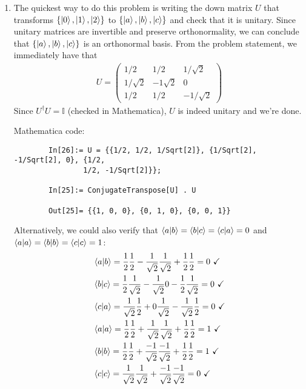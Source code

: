 \documentclass{article}
\theoremstyle{definition}
\newcommand{\f}[2]{\frac{#1}{#2}}
\begin{document}
\begin{enumerate}[label=(\alph*)]
	\item The quickest way to do this problem is writing the down matrix $U$ that transforms $\{\ket{0},\ket{1},\ket{2}\}$ to $\{\ket{a},\ket{b}, \ket{c}\}$ and check that it is unitary. Since unitary matrices are invertible and preserve orthonormality, we can conclude that $\{\ket{a},\ket{b}, \ket{c}\}$ is an orthonormal basis. From the problem statement, we immediately have that 
	\begin{align*}
		U = \begin{pmatrix}
			1/2 & 1/2 & 1/\sqrt{2} \\
			1/\sqrt{2} & -1\sqrt{2} & 0 \\
			1/2 & 1/2 & -1/\sqrt{2}
		\end{pmatrix}
	\end{align*}
	Since $U^\dagger U = \mathbb{I}$ (checked in Mathematica), $U$ is indeed unitary and we're done. 
	
	
	
	Mathematica code:
	\begin{lstlisting}
		In[26]:= U = {{1/2, 1/2, 1/Sqrt[2]}, {1/Sqrt[2], -1/Sqrt[2], 0}, {1/2,
				1/2, -1/Sqrt[2]}};
		
		In[25]:= ConjugateTranspose[U] . U
		
		Out[25]= {{1, 0, 0}, {0, 1, 0}, {0, 0, 1}}
	\end{lstlisting}
	
	Alternatively, we could also verify that $\bra{a}\ket{b}= \bra{b}\ket{c}= \bra{c}\ket{a}=0$ and $\braket{a} = \braket{b} = \braket{c} = 1$:
	\begin{align*}
		&\bra{a}\ket{b} = \f{1}{2}\f{1}{2} - \f{1}{\sqrt{2}} \f{1}{\sqrt{2}} + \f{1}{2}\f{1}{2} = 0 \,\,\checkmark\\
		&\bra{b}\ket{c} = \f{1}{2}\f{1}{\sqrt{2}} - \f{1}{\sqrt{2}} 0 - \f{1}{2}\f{1}{\sqrt{2}} = 0 \,\,\checkmark \\
		&\bra{c}\ket{a} = \f{1}{\sqrt{2}}\f{1}{2} + 0 \f{1}{\sqrt{2}} - \f{1}{\sqrt{2}} \f{1}{2} = 0 \,\,\checkmark\\
		&\braket{a} = \f{1}{2}\f{1}{2} + \f{1}{\sqrt{2}} \f{1}{\sqrt{2}} + \f{1}{2}\f{1}{2} = 1 \,\,\checkmark\\
		&\braket{b} = \f{1}{2}\f{1}{2} + \f{-1}{\sqrt{2}} \f{-1}{\sqrt{2}} + \f{1}{2}\f{1}{2} = 1 \,\,\checkmark\\
		&\braket{c} = \f{1}{\sqrt{2}} \f{1}{\sqrt{2}} + \f{-1}{\sqrt{2}} \f{-1}{\sqrt{2}} = 0\,\,\checkmark 
	\end{align*}
	

\end{enumerate}
\end{document}
